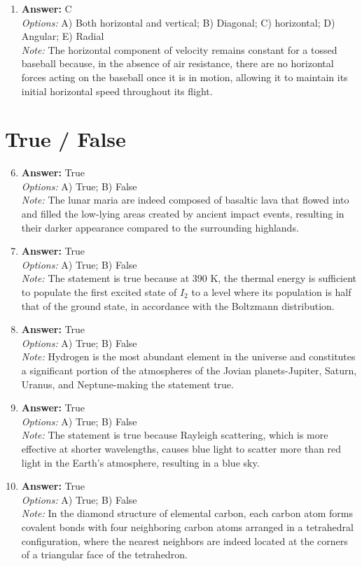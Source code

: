 \documentclass[12pt]{article}
\begin{document}
\begin{enumerate}[label=\arabic*.]
\item \textbf{Answer:} C
\\ \textit{Options:} A) Both horizontal and vertical; B) Diagonal; C) horizontal; D) Angular; E) Radial
\\ \textit{Note:} The horizontal component of velocity remains constant for a tossed baseball because, in the absence of air resistance, there are no horizontal forces acting on the baseball once it is in motion, allowing it to maintain its initial horizontal speed throughout its flight.
\end{enumerate}

\section*{True / False}
\begin{enumerate}[label=\arabic*.]
\setcounter{enumi}{5}
\item \textbf{Answer:} True
\\ \textit{Options:} A) True; B) False
\\ \textit{Note:} The lunar maria are indeed composed of basaltic lava that flowed into and filled the low-lying areas created by ancient impact events, resulting in their darker appearance compared to the surrounding highlands.
\item \textbf{Answer:} True
\\ \textit{Options:} A) True; B) False
\\ \textit{Note:} The statement is true because at 390 K, the thermal energy is sufficient to populate the first excited state of $I_2$ to a level where its population is half that of the ground state, in accordance with the Boltzmann distribution.
\item \textbf{Answer:} True
\\ \textit{Options:} A) True; B) False
\\ \textit{Note:} Hydrogen is the most abundant element in the universe and constitutes a significant portion of the atmospheres of the Jovian planets-Jupiter, Saturn, Uranus, and Neptune-making the statement true.
\item \textbf{Answer:} True
\\ \textit{Options:} A) True; B) False
\\ \textit{Note:} The statement is true because Rayleigh scattering, which is more effective at shorter wavelengths, causes blue light to scatter more than red light in the Earth's atmosphere, resulting in a blue sky.
\item \textbf{Answer:} True
\\ \textit{Options:} A) True; B) False
\\ \textit{Note:} In the diamond structure of elemental carbon, each carbon atom forms covalent bonds with four neighboring carbon atoms arranged in a tetrahedral configuration, where the nearest neighbors are indeed located at the corners of a triangular face of the tetrahedron.
\end{enumerate}
\end{document}
